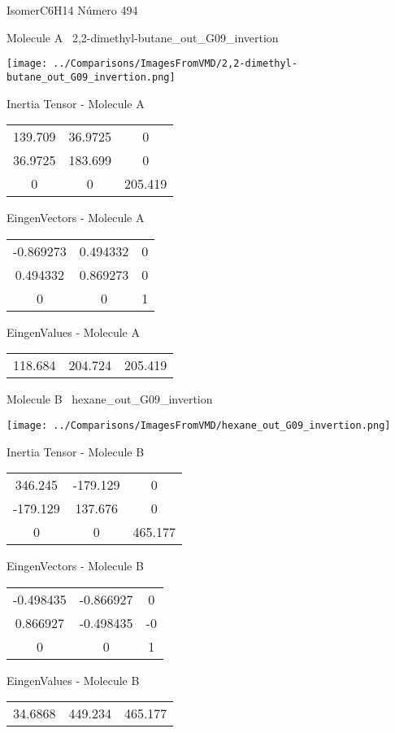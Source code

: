 \vtab[-3cm]
\begin{center}
{\large IsomerC6H14 \tab Número 494}
\end{center}
\begin{multicols}{2}
\begin{center}

Molecule A \
2,2-dimethyl-butane\_out\_G09\_invertion

\texttt{[image: ../Comparisons/ImagesFromVMD/2,2-dimethyl-butane\_out\_G09\_invertion.png]}

Inertia Tensor - Molecule A \\
\begin{tabular}{|c c c|}
139.709	 & 	36.9725	 & 	0	 \\
36.9725	 & 	183.699	 & 	0	 \\
0	 & 	0	 & 	205.419
\end{tabular}

\vtab
 EingenVectors - Molecule A     \\
\begin{tabular}{|c c c|}
-0.869273	 & 	0.494332	 & 	0	 \\
0.494332	 & 	0.869273	 & 	0	 \\
0	 & 	0	 & 	1
\end{tabular}

\vtab
 EingenValues - Molecule A     \\
\begin{tabular}{|c c c|}
118.684	 & 	204.724	 & 	205.419	 \\
\end{tabular}
\columnbreak

Molecule B \
hexane\_out\_G09\_invertion

\texttt{[image: ../Comparisons/ImagesFromVMD/hexane\_out\_G09\_invertion.png]}

Inertia Tensor - Molecule B \\
\begin{tabular}{|c c c|}
346.245	 & 	-179.129	 & 	0	 \\
-179.129	 & 	137.676	 & 	0	 \\
0	 & 	0	 & 	465.177
\end{tabular}

\vtab
 EingenVectors - Molecule B     \\
\begin{tabular}{|c c c|}
-0.498435	 & 	-0.866927	 & 	0	 \\
0.866927	 & 	-0.498435	 & 	-0	 \\
0	 & 	0	 & 	1
\end{tabular}

\vtab
 EingenValues - Molecule B     \\
\begin{tabular}{|c c c|}
34.6868	 & 	449.234	 & 	465.177	 \\
\end{tabular}

\end{center}
\end{multicols}

